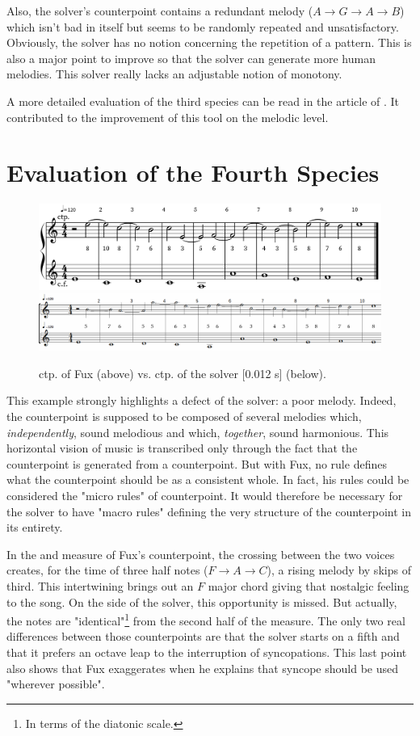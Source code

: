 Also, the solver's counterpoint contains a redundant melody ($A\to G\to A\to B$) which isn't bad in itself but seems to be randomly repeated and unsatisfactory. Obviously, the solver has no notion concerning the repetition of a pattern. This is also a major point to improve so that the solver can generate more human melodies. This solver really lacks an adjustable notion of monotony.

A more detailed evaluation of the third species can be read in the article of \textcite{JIM}. It contributed to the improvement of this tool on the melodic level.

\section{Evaluation of the Fourth Species}
\begin{figure}[h]
    \centering
    \includegraphics[height=\fhl]{Images/fux_4sp.png}
    \includegraphics[width=\textwidth, height=\fhs]{Images/solver_4sp.png}
    \caption{ ctp. of Fux (above) vs. ctp. of the solver [0.012 s] (below).}
    \label{fig:eval_4sp}
\end{figure}
This example strongly highlights a defect of the solver: a poor melody. Indeed, the counterpoint is supposed to be composed of several melodies which, \emph{independently}, sound melodious and which, \emph{together}, sound harmonious. This horizontal vision of music is transcribed only through the fact that the counterpoint is generated from a counterpoint. But with Fux, no rule defines what the counterpoint should be as a consistent whole. In fact, his rules could be considered the "micro rules" of counterpoint. It would therefore be necessary for the solver to have "macro rules" defining the very structure of the counterpoint in its entirety.

In the  and  measure of Fux's counterpoint, the crossing between the two voices creates, for the time of three half notes ($F\to A\to C$), a rising melody by skips of third. This intertwining brings out an $F$ major chord giving that nostalgic feeling to the song. On the side of the solver, this opportunity is missed. But actually, the notes are "identical"\footnote{In terms of the diatonic scale.} from the second half of the  measure. The only two real differences between those counterpoints are that the solver starts on a fifth and that it prefers an octave leap to the interruption of syncopations. This last point also shows that Fux exaggerates when he explains that syncope should be used "wherever possible"\parencite[p.89]{GaPEng}.

